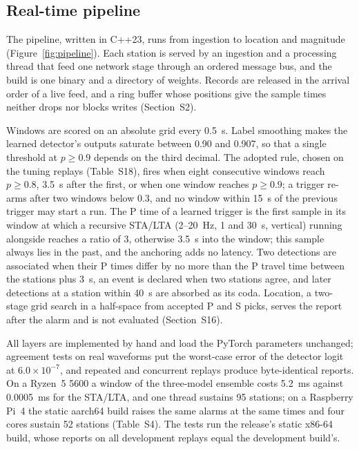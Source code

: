 \documentclass[a4paper,fleqn]{cas-sc}
\newcommand{\stalta}{STA/LTA}
\begin{document}
\subsection{Real-time pipeline}\label{sec:pipeline}

The pipeline, written in C++23, runs from ingestion to location and magnitude (Figure~\ref{fig:pipeline}). Each station is served by an
ingestion and a processing thread that feed one network stage through an ordered
message bus, and the build is one binary and a directory of weights. Records are
released in the arrival order of a live feed, and a ring buffer whose positions give
the sample times neither drops nor blocks writes (Section~S2).

Windows are scored on an absolute grid every 0.5~s. Label smoothing makes the
learned detector's outputs saturate between 0.90 and 0.907, so that a single threshold at
$p \geq 0.9$ depends on the third decimal. The adopted rule, chosen on the tuning
replays (Table~S18), fires when eight
consecutive windows reach $p \geq 0.8$, 3.5~s after the first, or when one window
reaches $p \geq 0.9$; a trigger re-arms after two windows below 0.3, and no window
within 15~s of the previous trigger may start a run. The P time of a learned trigger
is the first sample in its window at which a recursive \stalta{} (2--20~Hz, 1 and
30~s, vertical) running alongside reaches a ratio of 3, otherwise 3.5~s into the
window; this sample always lies in the past, and the anchoring adds no latency. Two
detections are associated when their P times differ by no more than the P travel time
between the stations plus 3~s, an event is declared when two stations agree, and
later detections at a station within 40~s are absorbed as its coda. Location, a
two-stage grid search in a half-space from accepted P and S picks, serves the report
after the alarm and is not evaluated (Section~S16).

All layers are implemented by hand and load the PyTorch \citep{paszke2019}
parameters unchanged; agreement tests on real waveforms put the worst-case error of
the detector logit at $6.0 \times 10^{-7}$, and repeated and concurrent replays
produce byte-identical reports. On a Ryzen~5 5600 a window of the three-model
ensemble costs 5.2~ms against 0.0005~ms for the \stalta{}, and one thread sustains
95 stations; on a Raspberry Pi~4 the static aarch64 build raises the same alarms at
the same times and four cores sustain 52 stations (Table~S4). The tests run the
release's static x86-64 build, whose reports on all development replays equal the
development build's.
\end{document}
